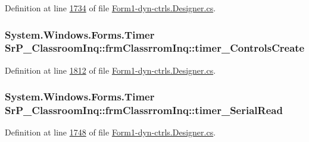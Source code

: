 \-Definition at line \hyperlink{_form1-dyn-ctrls_8_designer_8cs_source_l01734}{1734} of file \hyperlink{_form1-dyn-ctrls_8_designer_8cs_source}{\-Form1-\/dyn-\/ctrls.\-Designer.\-cs}.

\hypertarget{class_sr_p___classroom_inq_1_1frm_classrrom_inq_aa53f33f4a7245799242c52b4ceff8dab}{
\subsubsection[{timer\-\_\-\-Controls\-Create}]{\setlength{\rightskip}{0pt plus 5cm}\-System.\-Windows.\-Forms.\-Timer {\bf \-Sr\-P\-\_\-\-Classroom\-Inq\-::frm\-Classrrom\-Inq\-::timer\-\_\-\-Controls\-Create}}}
\label{class_sr_p___classroom_inq_1_1frm_classrrom_inq_aa53f33f4a7245799242c52b4ceff8dab}


\-Definition at line \hyperlink{_form1-dyn-ctrls_8_designer_8cs_source_l01812}{1812} of file \hyperlink{_form1-dyn-ctrls_8_designer_8cs_source}{\-Form1-\/dyn-\/ctrls.\-Designer.\-cs}.

\hypertarget{class_sr_p___classroom_inq_1_1frm_classrrom_inq_ae222e5fb7d4ed8ef65c9c3ff836cecf6}{
\subsubsection[{timer\-\_\-\-Serial\-Read}]{\setlength{\rightskip}{0pt plus 5cm}\-System.\-Windows.\-Forms.\-Timer {\bf \-Sr\-P\-\_\-\-Classroom\-Inq\-::frm\-Classrrom\-Inq\-::timer\-\_\-\-Serial\-Read}}}
\label{class_sr_p___classroom_inq_1_1frm_classrrom_inq_ae222e5fb7d4ed8ef65c9c3ff836cecf6}


\-Definition at line \hyperlink{_form1-dyn-ctrls_8_designer_8cs_source_l01748}{1748} of file \hyperlink{_form1-dyn-ctrls_8_designer_8cs_source}{\-Form1-\/dyn-\/ctrls.\-Designer.\-cs}.

